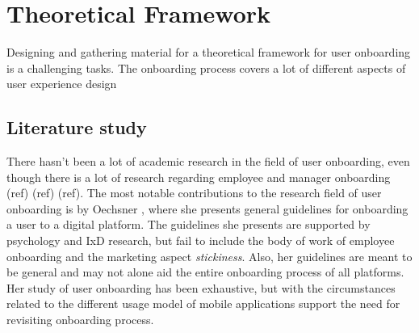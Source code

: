 

\chapter{Theoretical Framework}

Designing and gathering material for a theoretical framework for user onboarding is a challenging tasks. The onboarding process covers a lot of different aspects of user experience design

\label{chap:theoretical_framework}
\section{Literature study}
There hasn't been a lot of academic research in the field of user onboarding, even though there is a lot of research regarding employee and manager onboarding (ref) (ref) (ref). The most notable contributions to the research field of user onboarding is by Oechsner \cite{Oechsner2016}, where she presents general guidelines for onboarding a user to a digital platform. The guidelines she presents are supported by psychology and IxD research, but fail to include the body of work of employee onboarding and the marketing aspect \textit{stickiness}. Also, her guidelines are meant to be general and may not alone aid the entire onboarding process of all platforms. Her study of user onboarding has been exhaustive, but with the circumstances related to the different usage model of mobile applications support the need for revisiting onboarding process.

